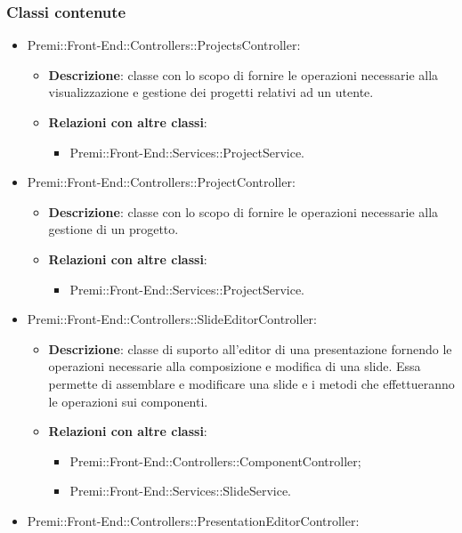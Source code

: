 \subsubsection{Classi contenute}
\begin{itemize}

	\item Premi::Front-End::Controllers::ProjectsController:
	\begin{itemize}
		\item \textbf{Descrizione}: classe con lo scopo di fornire le operazioni necessarie alla visualizzazione e gestione dei progetti relativi ad un utente.
		\item \textbf{Relazioni con altre classi}:
		\begin{itemize}
			\item Premi::Front-End::Services::ProjectService.
		\end{itemize}
	\end{itemize}
	\item  Premi::Front-End::Controllers::ProjectController:
	\begin{itemize}
		\item \textbf{Descrizione}: classe con lo scopo di fornire le operazioni necessarie alla gestione di un progetto.
		\item \textbf{Relazioni con altre classi}:
		\begin{itemize}
			\item Premi::Front-End::Services::ProjectService.
		\end{itemize}
	\end{itemize}
	\item  Premi::Front-End::Controllers::SlideEditorController:
	\begin{itemize}
		\item \textbf{Descrizione}: classe di suporto all'editor di una presentazione fornendo le operazioni necessarie alla composizione e modifica di una slide. Essa permette di assemblare e modificare una \gls{slide} e i metodi che effettueranno le operazioni sui componenti.
		\item \textbf{Relazioni con altre classi}:
		\begin{itemize}
			\item Premi::Front-End::Controllers::ComponentController;
			\item Premi::Front-End::Services::SlideService.
		\end{itemize}
	\end{itemize}
	\item  Premi::Front-End::Controllers::PresentationEditorController:

\end{itemize}
